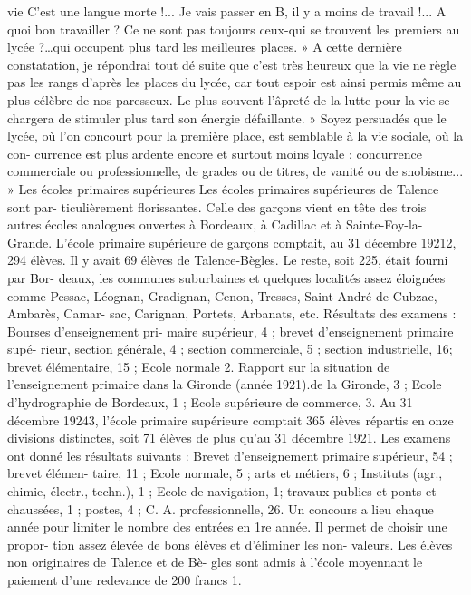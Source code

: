 \documentclass[a4paper,11pt]{book}
\begin{document}
vie
C'est une langue morte !... Je vais passer en B, il
y a moins de travail !... A quoi bon travailler ? Ce ne sont
pas toujours ceux-qui se trouvent les premiers au lycée
?…qui occupent plus tard les meilleures places. » A cette
dernière constatation, je répondrai tout dé suite que c'est
très heureux que la vie ne règle pas les rangs d'après les
places du lycée, car tout espoir est ainsi permis même au
plus célèbre de nos paresseux. Le plus souvent l'âpreté
de la lutte pour la vie se chargera de stimuler plus tard
son énergie défaillante.
» Soyez persuadés que le lycée, où l'on concourt pour la
première place, est semblable à la vie sociale, où la con-
currence est plus ardente encore et surtout moins loyale :
concurrence commerciale ou professionnelle, de grades ou
de titres, de vanité ou de snobisme... »
Les écoles primaires supérieures
Les écoles primaires supérieures de Talence sont par-
ticulièrement florissantes. Celle des garçons vient en tête
des trois autres écoles analogues ouvertes à Bordeaux, à
Cadillac et à Sainte-Foy-la-Grande.
L'école primaire supérieure de garçons comptait, au
31 décembre 19212, 294 élèves. Il y avait 69 élèves de
Talence-Bègles. Le reste, soit 225, était fourni par Bor-
deaux, les communes suburbaines et quelques localités
assez éloignées comme Pessac, Léognan, Gradignan,
Cenon, Tresses, Saint-André-de-Cubzac, Ambarès, Camar-
sac, Carignan, Portets, Arbanats, etc.
Résultats des examens : Bourses d'enseignement pri-
maire supérieur, 4 ; brevet d'enseignement primaire supé-
rieur, section générale, 4 ; section commerciale, 5 ; section
industrielle, 16; brevet élémentaire, 15 ; Ecole normale
2. Rapport sur la situation de l'enseignement primaire dans la Gironde
(année 1921).de la Gironde, 3 ; Ecole d'hydrographie de Bordeaux, 1 ;
Ecole supérieure de commerce, 3.
Au 31 décembre 19243, l'école primaire supérieure
comptait 365 élèves répartis en onze divisions distinctes,
soit 71 élèves de plus qu'au 31 décembre 1921.
Les examens ont donné les résultats suivants : Brevet
d'enseignement primaire supérieur, 54 ; brevet élémen-
taire, 11 ; Ecole normale, 5 ; arts et métiers, 6 ; Instituts
(agr., chimie, électr., techn.), 1 ; Ecole de navigation, 1;
travaux publics et ponts et chaussées, 1 ; postes, 4 ; C. A.
professionnelle, 26.
Un concours a lieu chaque année pour limiter le nombre
des entrées en 1re année. Il permet de choisir une propor-
tion assez élevée de bons élèves et d'éliminer les non-
valeurs. Les élèves non originaires de Talence et de Bè-
gles sont admis à l'école moyennant le paiement d'une
redevance de 200 francs 1.
\end{document}
